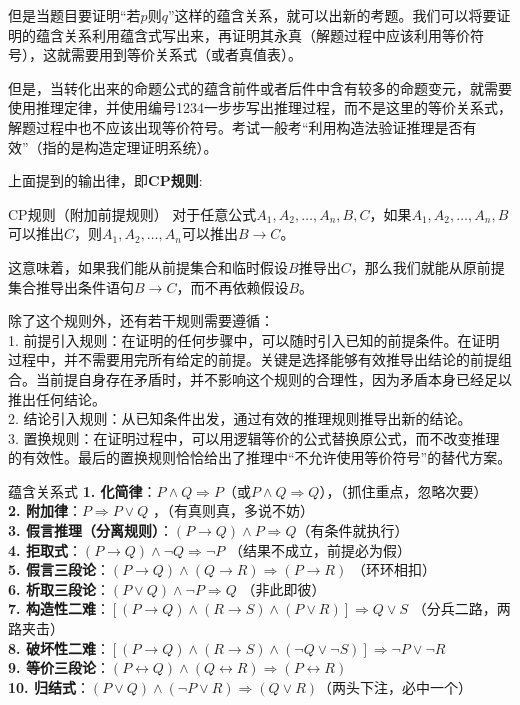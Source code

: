 但是当题目要证明“若$p$则$q$”这样的蕴含关系，就可以出新的考题。我们可以将要证明的蕴含关系利用蕴含式写出来，再证明其永真（解题过程中应该利用等价符号），这就需要用到等价关系式（或者真值表）。

但是，当转化出来的命题公式的蕴含前件或者后件中含有较多的命题变元，就需要使用推理定律，并使用编号1234一步步写出推理过程，而不是这里的等价关系式，解题过程中也不应该出现等价符号。考试一般考“利用构造法验证推理是否有效”（指的是构造定理证明系统）。

上面提到的输出律，即\textbf{CP规则}:
\begin{theorem}{CP规则（附加前提规则）}{}
对于任意公式$A_1, A_2, \ldots, A_n, B, C$，如果$A_1, A_2, \ldots, A_n, B$可以推出$C$，则$A_1, A_2, \ldots, A_n$可以推出$B \rightarrow C$。

这意味着，如果我们能从前提集合和临时假设$B$推导出$C$，那么我们就能从原前提集合推导出条件语句$B \rightarrow C$，而不再依赖假设$B$。
\end{theorem}
除了这个规则外，还有若干规则需要遵循：\\
1. 前提引入规则：在证明的任何步骤中，可以随时引入已知的前提条件。在证明过程中，并不需要用完所有给定的前提。关键是选择能够有效推导出结论的前提组合。当前提自身存在矛盾时，并不影响这个规则的合理性，因为矛盾本身已经足以推出任何结论。\\
2. 结论引入规则：从已知条件出发，通过有效的推理规则推导出新的结论。\\
3. 置换规则：在证明过程中，可以用逻辑等价的公式替换原公式，而不改变推理的有效性。最后的置换规则恰恰给出了推理中“不允许使用等价符号”的替代方案。
\begin{theorem}{蕴含关系式}{}
\textbf{1. 化简律}：$P \land Q \Rightarrow P$（或$P \land Q \Rightarrow Q$），（抓住重点，忽略次要）\\
\textbf{2. 附加律}：$P \Rightarrow P \lor Q$ ，（有真则真，多说不妨）\\
\textbf{3. 假言推理（分离规则）}：$(P \rightarrow Q) \land P \Rightarrow Q$（有条件就执行） \\
\textbf{4. 拒取式}：$(P \rightarrow Q) \land \neg Q \Rightarrow \neg P$ （结果不成立，前提必为假）\\
\textbf{5. 假言三段论}：$(P \rightarrow Q) \land (Q \rightarrow R) \Rightarrow (P \rightarrow R)$ （环环相扣）\\
\textbf{6. 析取三段论}：$(P \lor Q) \land \neg P \Rightarrow Q$ （非此即彼）\\
\textbf{7. 构造性二难}：$[(P \rightarrow Q) \land (R \rightarrow S)\land(P \lor R)] \Rightarrow Q \lor S$ （分兵二路，两路夹击）\\
\textbf{8. 破坏性二难}：$[(P \rightarrow Q) \land (R \rightarrow S)\land(\neg Q \lor \neg S)] \Rightarrow \neg P \lor \neg R$ \\
\textbf{9. 等价三段论}：$(P \leftrightarrow Q) \land (Q \leftrightarrow R) \Rightarrow (P \leftrightarrow R)$ \\
\textbf{10. 归结式}：$(P \lor Q) \land (\neg P \lor R) \Rightarrow (Q \lor R)$（两头下注，必中一个）
\end{theorem}

